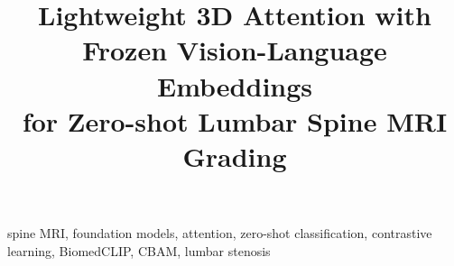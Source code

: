 \documentclass[conference]{IEEEtran}
\begin{document}
\title{Lightweight 3D Attention with Frozen Vision-Language Embeddings\\
       for Zero-shot Lumbar Spine MRI Grading}

\author{
        }

\maketitle



\begin{IEEEkeywords}
spine MRI, foundation models, attention, zero-shot classification,
contrastive learning, BiomedCLIP, CBAM, lumbar stenosis
\end{IEEEkeywords}











\end{document}
